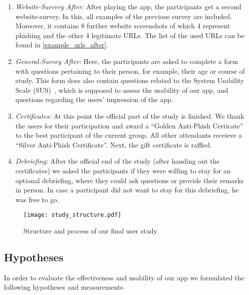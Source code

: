 \begin{enumerate}
	\item \textit{Website-Survery After:} After playing the app, the participants get a second website-survey.
 In this, all examples of the previous survey are included.
 Moreover, it contains 8 further website screenshots of which 4 represent phishing and the other 4 legitimate URLs.
  The list of the used URLs can be found in \autoref{example_urls_after}.

	\item \textit{General-Survey After:} Here, the participants are asked to complete a form with questions pertaining to their person, for example, their age or course of study.
 This form does also contain questions related to the System Usability Scale (SUS)~\cite{sus}, which is supposed to assess the usability of our app, and questions regarding the users' impression of the app.
	
	\item \textit{Certificates:} At this point the official part of the study is finished.
We thank the users for their participation and award a ``Golden Anti-Phish Certicate'' to the best participant of the current group.
All other attendants receieve a ``Silver Anti-Phish Certificate''.
Next, the gift certificate is raffled.

	\item \textit{Debriefing:} After the official end of the study (after handing out the certificates) we asked the participants if they were willing to stay for an optional debriefing, where they could ask questions or provide their remarks in person. In case a participant did not want to stay for this debriefing, he was free to go.
\end{enumerate}



\begin{figure}[hHtbp]
\centering
\texttt{[image: study\_structure.pdf]}%
\caption{Structure and process of our final user study}%
\label{fig:study_structure}%
\end{figure}

\subsection{Hypotheses}
In order to evaluate the effectiveness and usability of our app we formulated the following hypotheses and measurements.

